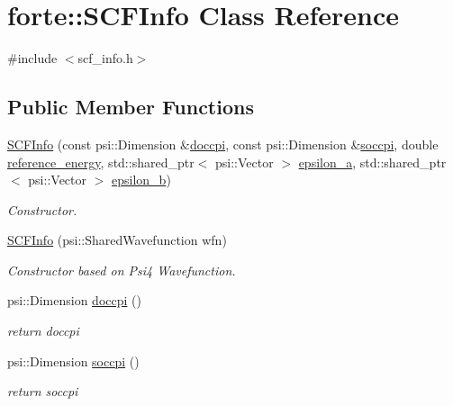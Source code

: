 \hypertarget{classforte_1_1_s_c_f_info}{}\section{forte\+:\+:S\+C\+F\+Info Class Reference}
\label{classforte_1_1_s_c_f_info}


{\ttfamily \#include $<$scf\+\_\+info.\+h$>$}

\subsection*{Public Member Functions}
\begin{DoxyCompactItemize}
\item 
\mbox{\hyperlink{classforte_1_1_s_c_f_info_a56e6edb474dc1190fd2a3846275e2727}{S\+C\+F\+Info}} (const psi\+::\+Dimension \&\mbox{\hyperlink{classforte_1_1_s_c_f_info_a6724509a53cf02da7b2ceae0dcf5974a}{doccpi}}, const psi\+::\+Dimension \&\mbox{\hyperlink{classforte_1_1_s_c_f_info_aa41db174bb41206fe98b4a5068e43fd4}{soccpi}}, double \mbox{\hyperlink{classforte_1_1_s_c_f_info_ac2c9c172c0a76720d80c2aae2fe0fb92}{reference\+\_\+energy}}, std\+::shared\+\_\+ptr$<$ psi\+::\+Vector $>$ \mbox{\hyperlink{classforte_1_1_s_c_f_info_aa28a836920447e78d806523759d46d7e}{epsilon\+\_\+a}}, std\+::shared\+\_\+ptr$<$ psi\+::\+Vector $>$ \mbox{\hyperlink{classforte_1_1_s_c_f_info_ae7bece269ec34eee0f9e47bd07d69a44}{epsilon\+\_\+b}})
\begin{DoxyCompactList}\small\item\em Constructor. \end{DoxyCompactList}\item 
\mbox{\hyperlink{classforte_1_1_s_c_f_info_a8d7c54510805b10fe84b88e6d9888832}{S\+C\+F\+Info}} (psi\+::\+Shared\+Wavefunction wfn)
\begin{DoxyCompactList}\small\item\em Constructor based on Psi4 Wavefunction. \end{DoxyCompactList}\item 
psi\+::\+Dimension \mbox{\hyperlink{classforte_1_1_s_c_f_info_a6724509a53cf02da7b2ceae0dcf5974a}{doccpi}} ()
\begin{DoxyCompactList}\small\item\em return doccpi \end{DoxyCompactList}\item 
psi\+::\+Dimension \mbox{\hyperlink{classforte_1_1_s_c_f_info_aa41db174bb41206fe98b4a5068e43fd4}{soccpi}} ()
\begin{DoxyCompactList}\small\item\em return soccpi \end{DoxyCompactList}\item 

\end{DoxyCompactItemize}

